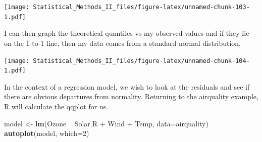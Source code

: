 \documentclass[]{book}
\newenvironment{Shaded}{\begin{snugshade}}{\end{snugshade}}
\newcommand{\KeywordTok}[1]{\textcolor[rgb]{0.13,0.29,0.53}{\textbf{{#1}}}}
\newcommand{\DataTypeTok}[1]{\textcolor[rgb]{0.13,0.29,0.53}{{#1}}}
\newcommand{\DecValTok}[1]{\textcolor[rgb]{0.00,0.00,0.81}{{#1}}}
\newcommand{\StringTok}[1]{\textcolor[rgb]{0.31,0.60,0.02}{{#1}}}
\newcommand{\CommentTok}[1]{\textcolor[rgb]{0.56,0.35,0.01}{\textit{{#1}}}}
\newcommand{\NormalTok}[1]{{#1}}
\theoremstyle{definition}
\theoremstyle{definition}
\theoremstyle{remark}
\begin{document}
\texttt{[image: Statistical\_Methods\_II\_files/figure-latex/unnamed-chunk-103-1.pdf]}

I can then graph the theoretical quantiles vs my observed values and if
they lie on the 1-to-1 line, then my data comes from a standard normal
distribution.

\begin{Shaded}
\end{Shaded}

\texttt{[image: Statistical\_Methods\_II\_files/figure-latex/unnamed-chunk-104-1.pdf]}

In the context of a regression model, we wish to look at the residuals
and see if there are obvious departures from normality. Returning to the
airquality example, R will calculate the qqplot for us.

\begin{Shaded}
\begin{Highlighting}[]
\NormalTok{model <-}\StringTok{ }\KeywordTok{lm}\NormalTok{(Ozone ~}\StringTok{ }\NormalTok{Solar.R +}\StringTok{ }\NormalTok{Wind +}\StringTok{ }\NormalTok{Temp, }\DataTypeTok{data=}\NormalTok{airquality)}
\KeywordTok{autoplot}\NormalTok{(model, }\DataTypeTok{which=}\DecValTok{2}\NormalTok{) }
\end{Highlighting}
\end{Shaded}
\end{document}
